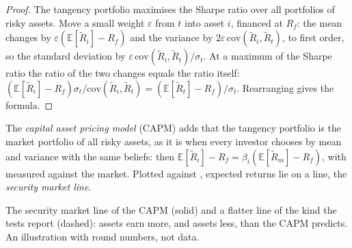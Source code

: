 \begin{proof}
The tangency portfolio maximises the Sharpe ratio over all portfolios of risky assets. Move a small
weight $\varepsilon$ from $t$ into asset $i$, financed at $R_f$: the mean  changes by
$\varepsilon(\mathbb{E}[\tilde R_i] - R_f)$ and the variance by $2\varepsilon\,\mathrm{cov}(\tilde R_i,
\tilde R_t)$, to first order, so the standard deviation by $\varepsilon\,\mathrm{cov}(\tilde R_i, \tilde
R_t)/\sigma_t$. At a maximum of the Sharpe ratio the ratio of the two changes equals the ratio itself:
$(\mathbb{E}[\tilde R_i] - R_f)\sigma_t/\mathrm{cov}(\tilde R_i, \tilde R_t) = (\mathbb{E}[\tilde R_t]
- R_f)/\sigma_t$. Rearranging gives the formula.
\end{proof}

\begin{definition}\label{def:b2:asset-prices:capm}
The \emph{capital asset pricing model} (CAPM) adds that the tangency
portfolio is the market portfolio of all risky assets, as it is when every investor chooses by mean and
variance with the same beliefs: then $\mathbb{E}[\tilde R_i] - R_f = \beta_i(\mathbb{E}[\tilde R_m] -
R_f)$, with  measured against the market. Plotted against , expected returns lie on a line,
the \emph{security market line}.
\end{definition}

\begin{omfigure}

{\small The security market line of the CAPM (solid) and a flatter line of the kind the tests report
(dashed):  assets earn more, and  assets less, than the CAPM predicts. An illustration
with round numbers, not data.}
\end{omfigure}

